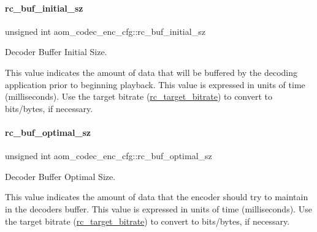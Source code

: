\paragraph{\texorpdfstring{rc\+\_\+buf\+\_\+initial\+\_\+sz}{rc\_buf\_initial\_sz}}
{\footnotesize\ttfamily unsigned int aom\+\_\+codec\+\_\+enc\+\_\+cfg\+::rc\+\_\+buf\+\_\+initial\+\_\+sz}



Decoder Buffer Initial Size. 

This value indicates the amount of data that will be buffered by the decoding application prior to beginning playback. This value is expressed in units of time (milliseconds). Use the target bitrate (\hyperlink{structaom__codec__enc__cfg_ab21539da477dba7506d90353c27d218b}{rc\+\_\+target\+\_\+bitrate}) to convert to bits/bytes, if necessary. \mbox{\label{structaom__codec__enc__cfg_aa4d9838419e94e634a02d710da06c842}} 
\paragraph{\texorpdfstring{rc\+\_\+buf\+\_\+optimal\+\_\+sz}{rc\_buf\_optimal\_sz}}
{\footnotesize\ttfamily unsigned int aom\+\_\+codec\+\_\+enc\+\_\+cfg\+::rc\+\_\+buf\+\_\+optimal\+\_\+sz}



Decoder Buffer Optimal Size. 

This value indicates the amount of data that the encoder should try to maintain in the decoder\textquotesingle{}s buffer. This value is expressed in units of time (milliseconds). Use the target bitrate (\hyperlink{structaom__codec__enc__cfg_ab21539da477dba7506d90353c27d218b}{rc\+\_\+target\+\_\+bitrate}) to convert to bits/bytes, if necessary. \mbox{\label{structaom__codec__enc__cfg_a630b9cb2fa79022a7b63cb0bed7e5fcb}} 
